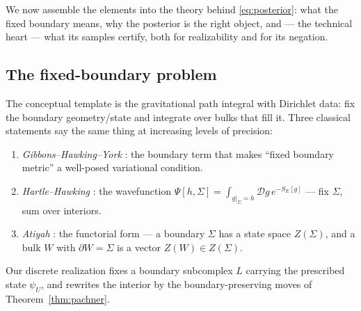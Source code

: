 \documentclass[11pt]{article}
\newcommand{\bd}{\partial}
\theoremstyle{definition}
\theoremstyle{plain}
\begin{document}
We now assemble the elements into the theory behind \eqref{eq:posterior}: what the fixed
boundary means, why the posterior is the right object, and --- the technical heart --- what
its samples certify, both for realizability and for its negation.

\subsection{The fixed-boundary problem}

The conceptual template is the gravitational path integral with Dirichlet data: fix the
boundary geometry/state and integrate over bulks that fill it. Three classical statements
say the same thing at increasing levels of precision:
\begin{enumerate}[label=(\roman*),leftmargin=2.4em]
\item \emph{Gibbons--Hawking--York} \cite{gibbons1977}: the boundary term that makes
``fixed boundary metric'' a well-posed variational condition.
\item \emph{Hartle--Hawking} \cite{hartle1983}: the wavefunction
$\Psi[h,\Sigma]=\int_{g|_\Sigma=h}\mathcal{D}g\,e^{-S_E[g]}$ --- fix $\Sigma$, sum over
interiors.
\item \emph{Atiyah} \cite{atiyah1988}: the functorial form --- a boundary $\Sigma$ has a
state space $Z(\Sigma)$, and a bulk $W$ with $\bd W=\Sigma$ is a vector $Z(W)\in
Z(\Sigma)$.
\end{enumerate}
Our discrete realization fixes a boundary subcomplex $L$ carrying the prescribed state
$\psi_U$, and rewrites the interior by the boundary-preserving moves of
Theorem~\ref{thm:pachner}.
\end{document}
